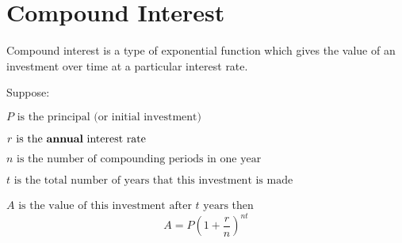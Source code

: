 \documentclass{ximera}
\begin{document}
\section{Compound Interest}

Compound interest is a type of exponential function which gives the value of an investment over time at a particular interest rate. 

Suppose:

$P \text{ is the principal (or initial investment)}$

$r \text{ is the {\bf annual} interest rate}$

$n \text{ is the number of compounding periods in one year}$

$t \text{ is the total number of years that this investment is made}$

$A \text{ is the value of this investment after } t \text{ years}$
then
$$ A = P\left( 1 + \frac{r}{n} \right)^{nt}$$
\end{document}
